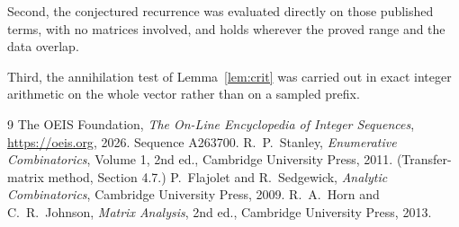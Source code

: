 \documentclass[11pt,a4paper]{article}
\theoremstyle{plain}
\theoremstyle{definition}
\begin{document}
Second, the conjectured recurrence was evaluated directly on those published terms, with no
matrices involved, and holds wherever the proved range and the data overlap.

Third, the annihilation test of Lemma~\ref{lem:crit} was carried out in exact integer
arithmetic on the whole vector rather than on a sampled prefix.

\begin{thebibliography}{9}
 The OEIS Foundation, \emph{The On-Line Encyclopedia of Integer
Sequences}, \url{https://oeis.org}, 2026. Sequence A263700.
 R.~P.~Stanley, \emph{Enumerative Combinatorics}, Volume 1, 2nd ed.,
Cambridge University Press, 2011. (Transfer-matrix method, Section 4.7.)
 P.~Flajolet and R.~Sedgewick, \emph{Analytic Combinatorics}, Cambridge
University Press, 2009.
 R.~A.~Horn and C.~R.~Johnson, \emph{Matrix Analysis}, 2nd ed., Cambridge
University Press, 2013.
\end{thebibliography}
\end{document}
